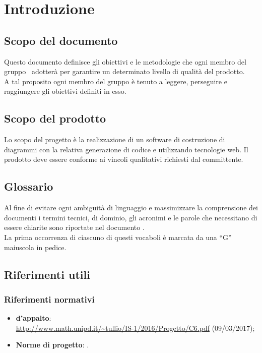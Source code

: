 \documentclass[../PianoDiQualifica.tex]{subfiles}
\begin{document}
	\section{Introduzione}
		\subsection{Scopo del documento} 
			Questo documento definisce gli obiettivi e le metodologie che ogni membro
			del gruppo \kaleidoscode\ adotterà per garantire un determinato livello di
			qualità del prodotto.\\
			A tal proposito ogni membro del gruppo è tenuto a leggere, perseguire e
			raggiungere gli obiettivi definiti in esso.
		\subsection{Scopo del prodotto}
			Lo scopo del progetto è la realizzazione di un software di
			costruzione di diagrammi  con la relativa generazione
			di codice  e  utilizzando tecnologie
			web. Il prodotto deve essere conforme ai vincoli qualitativi
			richiesti dal committente.
		\subsection{Glossario}
			Al fine di evitare ogni ambiguità di linguaggio e massimizzare la
			comprensione dei documenti i termini tecnici, di dominio, gli
			acronimi e le parole che necessitano di essere chiarite sono
			riportate nel documento \glossariov.\\
			La prima occorrenza di ciascuno di questi vocaboli è
			marcata da una ``G'' maiuscola in pedice.
		\subsection{Riferimenti utili}
			\subsubsection{Riferimenti normativi}
    			\begin{itemize}
    				\item \textbf{ d'appalto}:\\
    				\url{http://www.math.unipd.it/~tullio/IS-1/2016/Progetto/C6.pdf} (09/03/2017);
    				\item \textbf{Norme di progetto}: \normediprogettov.
				\end{itemize}
\end{document}
